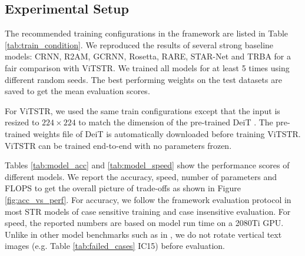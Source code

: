 \documentclass[runningheads]{llncs}
\begin{document}
\subsection{Experimental Setup}

The recommended training configurations in the framework are listed in Table \ref{tab:train_condition}. We reproduced the results of several strong baseline models: CRNN, R2AM, GCRNN, Rosetta, RARE, STAR-Net and TRBA for a fair comparison with ViTSTR. We trained all models for at least 5 times using different random seeds. The best performing weights on the test datasets are saved to get the mean evaluation scores. 

For ViTSTR, we used the same train configurations except that the input is resized to $224\times{224}$ to match the dimension of the pre-trained DeiT \cite{touvron2020training}. The pre-trained weights file of DeiT is automatically downloaded before training ViTSTR. ViTSTR can be trained end-to-end with no parameters frozen.


Tables \ref{tab:model_acc} and \ref{tab:model_speed} show the performance scores of different models. We report the accuracy, speed, number of parameters and FLOPS to get the overall picture of trade-offs as shown in Figure \ref{fig:acc_vs_perf}. For accuracy, we follow the framework evaluation protocol in most STR models of case sensitive training and case insensitive evaluation. For speed, the reported numbers are based on model run time on a 2080Ti GPU. Unlike in other model benchmarks such as in \cite{li2019show,litman2020scatter}, we do not rotate vertical text images (e.g. Table \ref{tab:failed_cases} IC15) before evaluation. 
\end{document}
